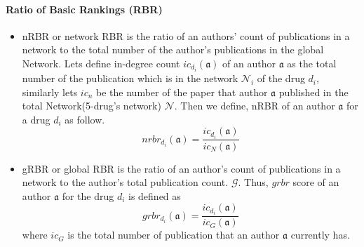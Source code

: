 \documentclass[10pt,letterpaper]{article}
\begin{document}
\paragraph{Ratio of Basic Rankings (RBR)}
\begin{itemize}
\item nRBR or network RBR is the ratio of an authors' count of publications in a network to the total number of the author's publications in the global Network. 
Lets define in-degree count $ic_{d_i}(\mathfrak{a})$ of an author $\mathfrak{a}$ as the total number of the publication which is in the network $\mathcal{N}_i$ of the drug $d_i$, similarly lets $ic_{n}$ be the number of the paper that author $\mathfrak{a}$ published in the total Network(5-drug's network) $\mathcal{N}$. Then we define, nRBR of an author $\mathfrak{a}$  for a drug $d_i$ as follow.
$$ nrbr_{d_i}(\mathfrak{a}) = \dfrac{ic_{d_i}(\mathfrak{a})}{ic_{N}(\mathfrak{a})}$$
\item gRBR or global RBR is the ratio of an author's count of publications in a network to the author's total publication count. $\mathcal{G}$. Thus, $grbr$ score of an author  $\mathfrak{a}$  for the drug $d_i$ is defined as 
$$grbr_{d_i}(\mathfrak{a}) = \dfrac{ic_{d_i}(\mathfrak{a})}{ic_{G}(\mathfrak{a})}$$
where $ic_{G}$ is the total number of publication that an author $\mathfrak{a}$ currently has.
\end{itemize}
\clearpage
\end{document}
